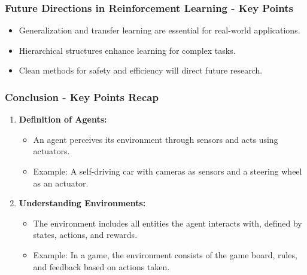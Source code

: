 \documentclass[aspectratio=169]{beamer}
\begin{document}
\begin{frame}[fragile]
    \frametitle{Future Directions in Reinforcement Learning - Key Points}
    \begin{itemize}
        \item Generalization and transfer learning are essential for real-world applications.
        \item Hierarchical structures enhance learning for complex tasks.
        \item Clean methods for safety and efficiency will direct future research.
    \end{itemize}
\end{frame}

\begin{frame}[fragile]
  \frametitle{Conclusion - Key Points Recap}
  \begin{enumerate}
    \item \textbf{Definition of Agents:}
    \begin{itemize}
      \item An agent perceives its environment through sensors and acts using actuators.
      \item Example: A self-driving car with cameras as sensors and a steering wheel as an actuator.
    \end{itemize}

    \item \textbf{Understanding Environments:}
    \begin{itemize}
      \item The environment includes all entities the agent interacts with, defined by states, actions, and rewards.
      \item Example: In a game, the environment consists of the game board, rules, and feedback based on actions taken.
    \end{itemize}
  \end{enumerate}
\end{frame}
\end{document}
